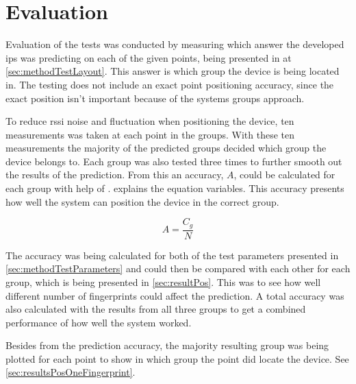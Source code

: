 \section{Evaluation}\label{sec:methodEvaluation}
Evaluation of the tests was conducted by measuring which answer the developed \acrshort{ips} was predicting on each of the given points, being presented in  at \cref{sec:methodTestLayout}.
This answer is which group the device is being located in.
The testing does not include an exact point positioning accuracy, since the exact position isn't important because of the systems groups approach.

\bigskip

To reduce \acrshort{rssi} noise and fluctuation when positioning the device, ten measurements was taken at each point in the groups.
With these ten measurements the majority of the predicted groups decided which group the device belongs to.
Each group was also tested three times to further smooth out the results of the prediction.
From this an accuracy, $A$, could be calculated for each group with help of .
 explains the equation variables.
This accuracy presents how well the system can position the device in the correct group.

\begin{equation}\label{eq:evaluation}	
	A = \frac{C_g}{N}
\end{equation}


The accuracy was being calculated for both of the test parameters presented in \cref{sec:methodTestParameters} and could then be compared with each other for each group, which is being presented in \cref{sec:resultPos}.
This was to see how well different number of fingerprints could affect the prediction.
A total accuracy was also calculated with the results from all three groups to get a combined performance of how well the system worked.

\bigskip

Besides from the prediction accuracy, the majority resulting group was being plotted for each point to show in which group the point did locate the device.
See \cref{sec:resultsPosOneFingerprint}.

